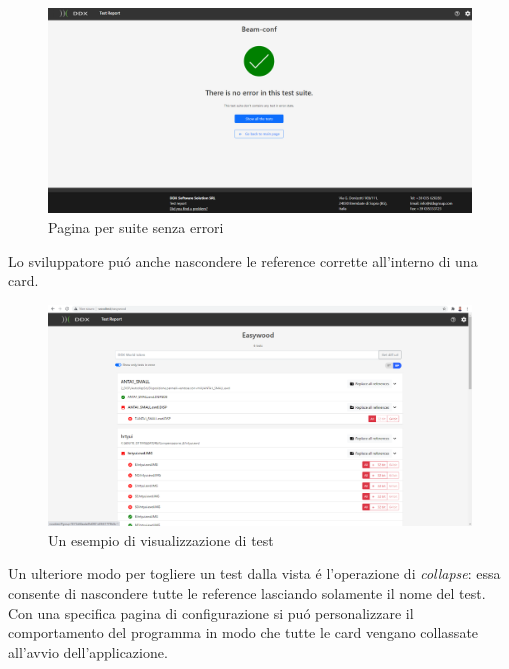             \begin{figure}[h!]
                \includegraphics[width=\textwidth]{images/no_error_page.png}
                \caption{Pagina per suite senza errori}
            \end{figure}

            Lo sviluppatore pu\'o anche nascondere le reference corrette all'interno di una card.\\

            \begin{figure}[h!]
                \includegraphics[width=\textwidth]{images/page.png}
                \caption{Un esempio di visualizzazione di test}
            \end{figure}

            Un ulteriore modo per togliere un test dalla vista \'e l'operazione di \textit{collapse}: essa consente di nascondere tutte le reference lasciando solamente il nome del test.\\
            Con una specifica pagina di configurazione si pu\'o personalizzare il comportamento del programma in modo che tutte le card vengano collassate all'avvio dell'applicazione.\\
            
